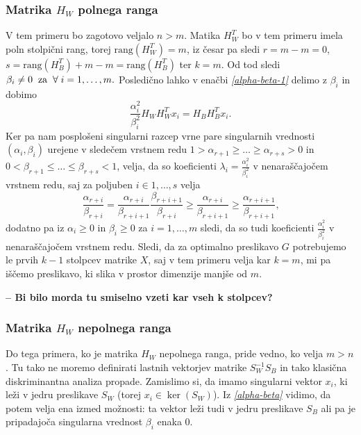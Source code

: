 \documentclass[mat1]{article}
\theoremstyle{definition}
\begin{document}
\subsubsection{Matrika $H_W$ polnega ranga}
V tem primeru bo zagotovo veljalo $n > m$. Matika $H_W^T$ bo v tem primeru imela poln stolpični rang, torej $\text{rang}(H_W^T) = m$, iz česar pa sledi $r = m - m = 0$, $s = \text{rang}(H_B^T) + m - m = \text{rang}(H_B^T)$ ter $k = m$. Od tod sledi $\beta_i \neq 0 \hspace{2mm}  \text{za} \hspace{2mm}\forall \hspace{1mm} i = 1, \ldots, m \text{.}$ Posledično lahko v enačbi \textit{\eqref{alpha-beta-1}} delimo z $\beta_i$ in dobimo 
$$
\frac{\alpha_i^2}{\beta_i^2} H_W H_W^T x_i =  H_B H_B^T x_i
\text{.}
$$
Ker pa nam posplošeni singularni razcep vrne pare singularnih vrednosti $(\alpha_i, \beta_i)$ urejene v sledečem vrstnem redu $1 > \alpha_{r+1} \geq \ldots \geq \alpha_{r+s} > 0$ in $0 < \beta_{r+1} \leq \ldots \leq \beta_{r+s} < 1$, velja, da so koeficienti $\lambda_i = \frac{\alpha_i^2}{\beta_i^2}$ v nenaraščajočem vrstnem redu, saj za poljuben $i \in {1, \ldots, s}$ velja
$$
\frac{\alpha_{r+i}}{\beta_{r+i}} = 
\frac{\alpha_{r+i}}{\beta_{r+i+1}} \frac{\beta_{r+i + 1}}{\beta_{r+i}} 
\geq 
\frac{\alpha_{r+i}}{\beta_{r+i+1}}
\geq
\frac{\alpha_{r+i+1}}{\beta_{r+i+1}}
\text{,}
$$
dodatno pa iz $\alpha_i \geq 0$ in $\beta_i \geq 0$ za $i = 1, \ldots, m$ sledi, da so tudi koeficienti $\frac{\alpha_i^2}{\beta_i^2}$ v nenaraščajočem vrstnem redu. Sledi, da za optimalno preslikavo $G$ potrebujemo le prvih $k - 1$ stolpcev matrike $X$, saj v tem primeru velja kar $k = m$, mi pa iščemo preslikavo, ki slika v prostor dimenzije manjše od $m$.

\textbf{-- Bi bilo morda tu smiselno vzeti kar vseh k stolpcev?}

\subsubsection{Matrika $H_W$ nepolnega ranga}
Do tega primera, ko je matrika $H_W$ nepolnega ranga, pride vedno, ko velja $m>n$. Tu tako ne moremo definirati lastnih vektorjev matrike $S_W^{-1} S_B$ in tako klasična diskriminantna analiza propade. Zamislimo si, da imamo singularni vektor $x_i$, ki leži v jedru preslikave $S_W$ (torej $x_i \in \ker (S_W)$).  Iz \textit{\eqref{alpha-beta}} vidimo, da potem velja ena izmed možnosti: ta vektor leži tudi v jedru preslikave $S_B$ ali pa je pripadajoča singularna vrednost $\beta_i$ enaka 0.
\end{document}
